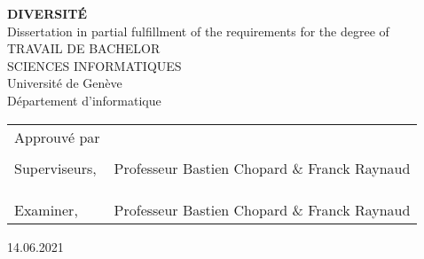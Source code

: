 
\thispagestyle{empty}

\vspace*{+5em}
\begin{center}
\textbf{DIVERSITÉ}\\
\vspace*{+4em}
Dissertation in partial fulfillment of the requirements for the degree of\\
\vspace{+2em}
TRAVAIL DE BACHELOR\\
SCIENCES INFORMATIQUES\\

\vspace*{+3em}
Université de Genève\\
Département d'informatique\\
\vspace*{+2em}

\end{center}

\begin{tabular}{ l l }
 Approuvé par &   \\
  & \\
  Superviseurs, & Professeur Bastien Chopard \& Franck Raynaud  \\ 
  & \\
  & \\
  & \\
 Examiner, & Professeur Bastien Chopard \& Franck Raynaud \\ 
\end{tabular}

\vspace*{+4em}

\begin{center}
14.06.2021
\end{center}

